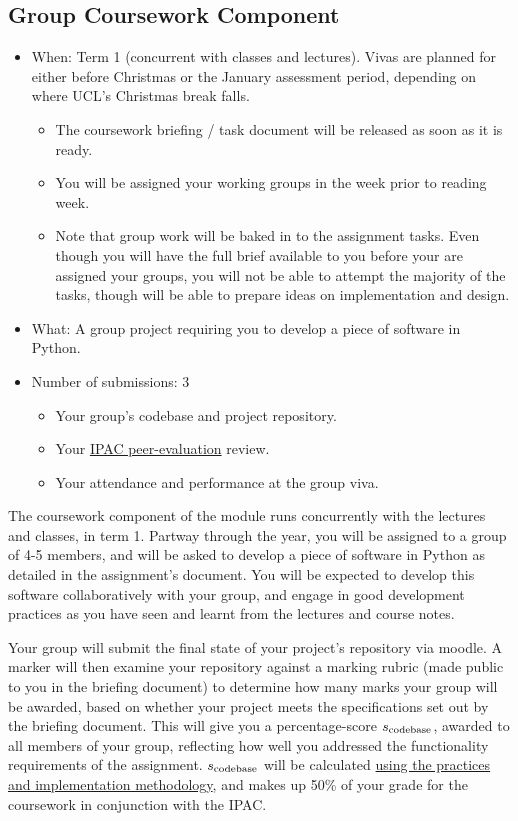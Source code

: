
\subsection{Group Coursework Component}

\begin{itemize}
  \item When: Term 1 (concurrent with classes and lectures). Vivas are planned for either before Christmas or the January assessment period, depending on where UCL's Christmas break falls.
        \begin{itemize}
          \item The coursework briefing / task document will be released as soon as it is ready.
          \item You will be assigned your working groups in the week prior to reading week.
          \item Note that group work will be baked in to the assignment tasks.
                Even though you will have the full brief available to you before your are assigned your groups, you will not be able to attempt the majority of the tasks, though will be able to prepare ideas on implementation and design.
        \end{itemize}
  \item What: A group project requiring you to develop a piece of software in Python.
  \item Number of submissions: 3
        \begin{itemize}
          \item Your group's codebase and project repository.
          \item Your \href{https://app.ipac-app.education/website/}{IPAC peer-evaluation} review.
          \item Your attendance and performance at the group viva.
        \end{itemize}
\end{itemize}

The coursework component of the module runs concurrently with the lectures and classes, in term 1.
Partway through the year, you will be assigned to a group of 4-5 members, and will be asked to develop a piece of software in Python as detailed in the assignment's document.
You will be expected to develop this software collaboratively with your group, and engage in good development practices as you have seen and learnt from the lectures and course notes.

Your group will submit the final state of your project's repository via moodle.
A marker will then examine your repository against a marking rubric (made public to you in the briefing document) to determine how many marks your group will be awarded, based on whether your project meets the specifications set out by the briefing document.
This will give you a percentage-score $s_{\mathrm{codebase}}$, awarded to all members of your group, reflecting how well you addressed the functionality requirements of the assignment.
$s_{\mathrm{codebase}}$ will be calculated \hyperref[sec:practices-implementation-weight]{using the practices and implementation methodology}, and makes up 50\% of your grade for the coursework in conjunction with the IPAC.

